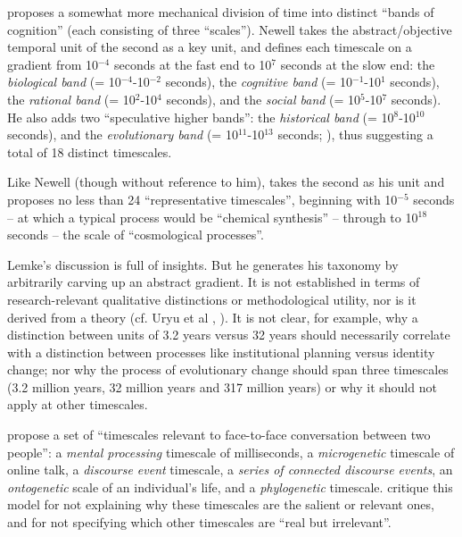 \citet[122]{newell_unified_1990} proposes a somewhat more mechanical division of time 
into distinct ``bands of cognition'' (each consisting of three ``scales''). Newell takes the abstract/objective temporal unit of the second as a key 
unit, and defines each timescale on a gradient from 10$^{-4}$ 
seconds at the fast end to 10$^{7}$ seconds at the slow end: the 
\textit{biological band} (= 10$^{-4}$-10$^{-2}$ seconds), the 
\textit{cognitive band} (= 10$^{-1}$-10$^{1}$ seconds), the 
\textit{rational band} (= 10$^{2}$-10$^{4}$ seconds), and the 
\textit{social band} (= 10$^{5}$-10$^{7}$ seconds). He also 
adds two ``speculative higher bands'': the \textit{historical band} (= 
10$^{8}$-10$^{10}$ seconds), and the \textit{evolutionary band} 
(= 10$^{11}$-10$^{13}$ seconds; \citealt[152]{newell_unified_1990}), thus suggesting a 
total of 18 distinct timescales. 



Like Newell (though without reference to him), \citet[277]{lemke_across_2000} takes 
the second as his unit and proposes no less than 24 ``representative 
timescales'', beginning with 10$^{-5}$ seconds -- at which a typical 
process would be ``chemical synthesis'' -- through to 10$^{18}$ 
seconds -- the scale of ``cosmological processes''. 



Lemke's discussion is full of insights. But he generates his taxonomy by arbitrarily carving up an abstract gradient. It is not established in terms of research-relevant qualitative distinctions or 
methodological utility, nor is it derived from a theory (cf.  
Uryu et al \citeyear{uryu_ecology_2014}, \citeyear[169]{larsen-freeman_complexity_2008}). It is not clear, for example, why a distinction between units of 3.2 years 
versus 32 years should necessarily correlate with a distinction between 
processes like institutional planning versus identity change; nor why 
the process of evolutionary change should span three timescales (3.2 
million years, 32 million years and 317 million years) or why it should 
not apply at other timescales. 



\citet[169]{larsen-freeman_complexity_2008} propose a set of ``timescales 
relevant to face-to-face conversation between two people'': a \textit{mental processing }timescale of milliseconds, a \textit{microgenetic }
timescale of online talk, a \textit{discourse event} timescale, a 
\textit{series of connected discourse events}, an \textit{ontogenetic }scale of an individual's life, and a \textit{phylogenetic} timescale. \citet{uryu_ecology_2014} critique this model for not explaining why these 
timescales are the salient or relevant ones, and for not specifying 
which other timescales are ``real but irrelevant''. 



